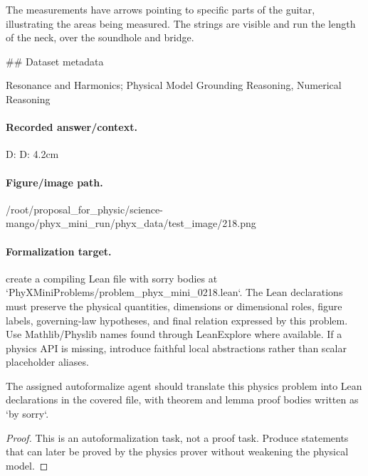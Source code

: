 The measurements have arrows pointing to specific parts of the guitar, illustrating the areas being measured. The strings are visible and run the length of the neck, over the soundhole and bridge.

\#\# Dataset metadata

Resonance and Harmonics; Physical Model Grounding Reasoning, Numerical Reasoning

\paragraph{Recorded answer/context.}
D: D: 4.2cm

\paragraph{Figure/image path.}
/root/proposal\_for\_physic/science-mango/phyx\_mini\_run/phyx\_data/test\_image/218.png

\paragraph{Formalization target.}
create a compiling Lean file with sorry bodies at `PhyXMiniProblems/problem\_phyx\_mini\_0218.lean`. The Lean declarations must preserve the physical quantities, dimensions or dimensional roles, figure labels, governing-law hypotheses, and final relation expressed by this problem.
Use Mathlib/Physlib names found through LeanExplore where available. If a physics API is missing, introduce faithful local abstractions rather than scalar placeholder aliases.

\begin{theorem}
\label{thm:physics:phyx_mini_0218:target}
The assigned autoformalize agent should translate this physics problem into Lean declarations in the covered file, with theorem and lemma proof bodies written as `by sorry`.
\end{theorem}
\begin{proof}
This is an autoformalization task, not a proof task. Produce statements that can later be proved by the physics prover without weakening the physical model.
\end{proof}

